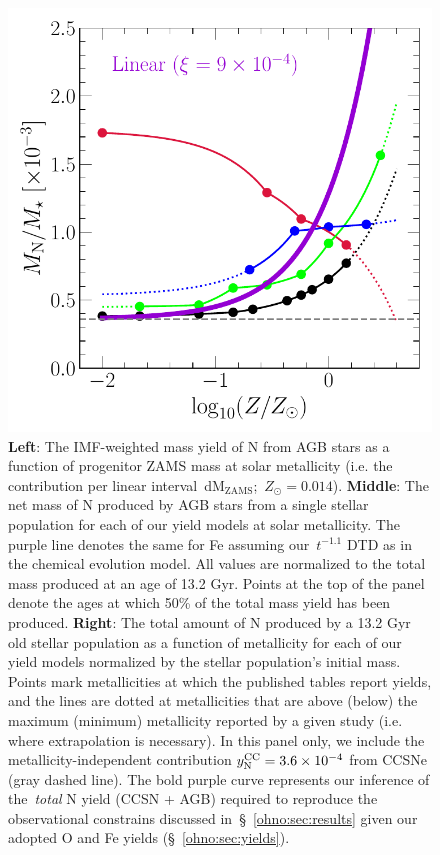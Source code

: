 \begin{figure}
\includegraphics[scale = 0.46]{ssp_production_metdep.pdf}
\caption{
\textbf{Left}: The IMF-weighted mass yield of N from AGB stars as a function of
progenitor ZAMS mass at solar metallicity (i.e. the contribution per linear
interval~dM$_\text{ZAMS}$;~$Z_\odot = 0.014$).
\textbf{Middle}: The net mass of N produced by AGB stars from a single stellar
population for each of our yield models at solar metallicity.
The purple line denotes the same for Fe assuming our~$t^{-1.1}$ DTD as in the
\citet{Johnson2021} chemical evolution model.
All values are normalized to the total mass produced at an age of 13.2 Gyr.
Points at the top of the panel denote the ages at which 50\% of the total mass
yield has been produced.
\textbf{Right}: The total amount of N produced by a 13.2 Gyr old stellar
population as a function of metallicity for each of our yield models normalized
by the stellar population's initial mass.
Points mark metallicities at which the published tables report yields, and the
lines are dotted at metallicities that are above (below) the maximum (minimum)
metallicity reported by a given study (i.e. where extrapolation is necessary).
In this panel only, we include the metallicity-independent contribution
$y_\text{N}^\text{CC} = 3.6\times10^{-4}$ from CCSNe (gray dashed line).
The bold purple curve represents our inference of the~\textit{total} N yield
(CCSN + AGB) required to reproduce the observational constrains discussed
in~\S~\ref{ohno:sec:results} given our adopted O and Fe yields (\S~\ref{ohno:sec:yields}).
}
\label{ohno:fig:ssp}
\end{figure}

